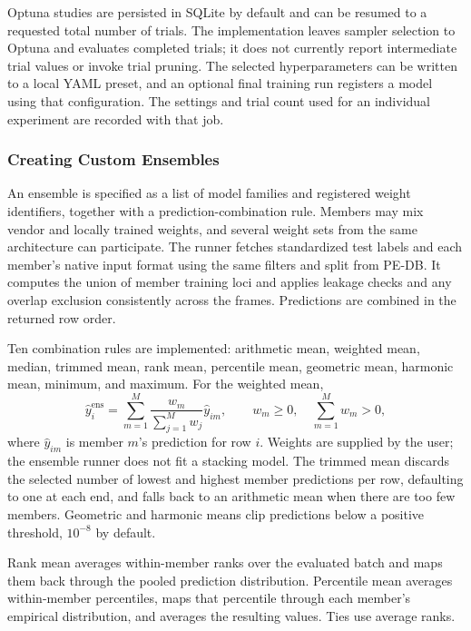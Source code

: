 \documentclass{article}
\begin{document}
Optuna studies are persisted in SQLite by default and can be resumed to a requested total number of trials. 
The implementation leaves sampler selection to Optuna and evaluates completed trials; it does not currently report intermediate trial values or invoke trial pruning. The selected hyperparameters can be written to a local YAML preset, and an optional final training run registers a model using that configuration. The settings and trial count used for an individual experiment are recorded with that job.

\subsubsection{Creating Custom Ensembles}

An ensemble is specified as a list of model families and registered weight identifiers, together with a prediction-combination rule. Members may mix vendor and locally trained weights, and several weight sets from the same architecture can participate. The runner fetches standardized test labels and each member's native input format using the same filters and split from PE-DB. It computes the union of member training loci and applies leakage checks and any overlap exclusion consistently across the frames. Predictions are combined in the returned row order.

Ten combination rules are implemented: arithmetic mean, weighted mean, median, trimmed mean, rank mean, percentile mean, geometric mean, harmonic mean, minimum, and maximum. For the weighted mean,
\begin{equation}
    \hat y_i^{\mathrm{ens}} = \sum_{m=1}^{M}\frac{w_m}{\sum_{j=1}^{M}w_j}\hat y_{im},
    \qquad w_m\geq 0,\quad \sum_{m=1}^{M}w_m>0,
    \label{eq:ensemble-weighted-mean}
\end{equation}
where $\hat y_{im}$ is member $m$'s prediction for row $i$. Weights are supplied by the user; the ensemble runner does not fit a stacking model. The trimmed mean discards the selected number of lowest and highest member predictions per row, defaulting to one at each end, and falls back to an arithmetic mean when there are too few members. Geometric and harmonic means clip predictions below a positive threshold, $10^{-8}$ by default.

Rank mean averages within-member ranks over the evaluated batch and maps them back through the pooled prediction distribution. Percentile mean averages within-member percentiles, maps that percentile through each member's empirical distribution, and averages the resulting values. Ties use average ranks. 
\end{document}
